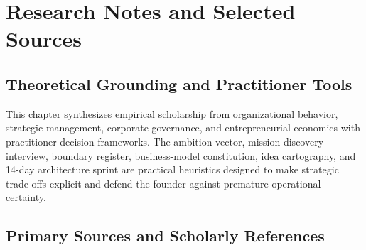 \section{Research Notes and Selected Sources}

\subsection{Theoretical Grounding and Practitioner Tools}

This chapter synthesizes empirical scholarship from organizational behavior, strategic management, corporate governance, and entrepreneurial economics with practitioner decision frameworks. The ambition vector, mission-discovery interview, boundary register, business-model constitution, idea cartography, and 14-day architecture sprint are practical heuristics designed to make strategic trade-offs explicit and defend the founder against premature operational certainty.

\subsection{Primary Sources and Scholarly References}

